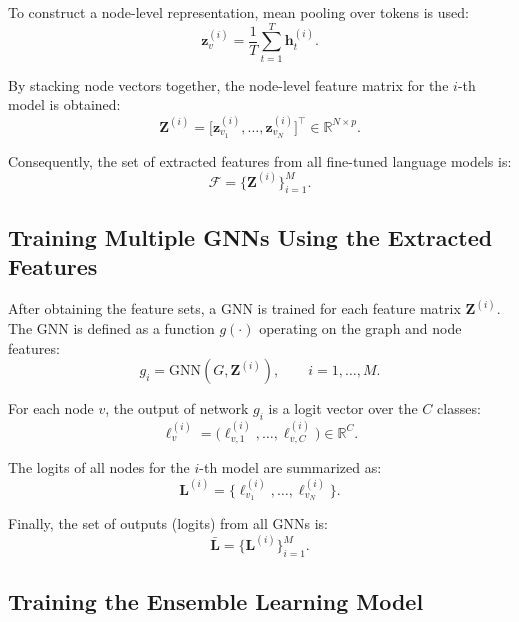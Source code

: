 \documentclass{article}
\begin{document}
To construct a node-level representation, mean pooling over tokens is used:
\begin{equation}
\mathbf{z}^{(i)}_{v}=\frac{1}{T}\sum_{t=1}^{T}\mathbf{h}^{(i)}_{t}.
\end{equation}

By stacking node vectors together, the node-level feature matrix for the $i$-th model is obtained:
\begin{equation}
\mathbf{Z}^{(i)}=\big[\mathbf{z}^{(i)}_{v_1},\dots,\mathbf{z}^{(i)}_{v_N}\big]^{\top}\in\mathbb{R}^{N\times p}.
\end{equation}

Consequently, the set of extracted features from all fine-tuned language models is:
\begin{equation}
\mathcal{F}=\{\mathbf{Z}^{(i)}\}_{i=1}^{M}.
\end{equation}

\subsection{Training Multiple GNNs Using the Extracted Features}

After obtaining the feature sets, a GNN is trained for each feature matrix $\mathbf{Z}^{(i)}$. The GNN is defined as a function $g(\cdot)$ operating on the graph and node features:
\begin{equation}
g_i = \mathrm{GNN}(G,\mathbf{Z}^{(i)}), \qquad i=1,\dots,M.
\end{equation}

For each node $v$, the output of network $g_i$ is a logit vector over the $C$ classes:
\begin{equation}
\boldsymbol{\ell}^{(i)}_{v}=\big(\ell^{(i)}_{v,1},\dots,\ell^{(i)}_{v,C}\big)\in\mathbb{R}^{C}.
\end{equation}

The logits of all nodes for the $i$-th model are summarized as:
\begin{equation}
\mathbf{L}^{(i)}=\{\boldsymbol{\ell}^{(i)}_{v_1},\dots,\boldsymbol{\ell}^{(i)}_{v_N}\}.
\end{equation}

Finally, the set of outputs (logits) from all GNNs is:
\begin{equation}
\bar{\mathbf{L}}=\{\mathbf{L}^{(i)}\}_{i=1}^{M}.
\end{equation}

\subsection{Training the Ensemble Learning Model}
\end{document}
